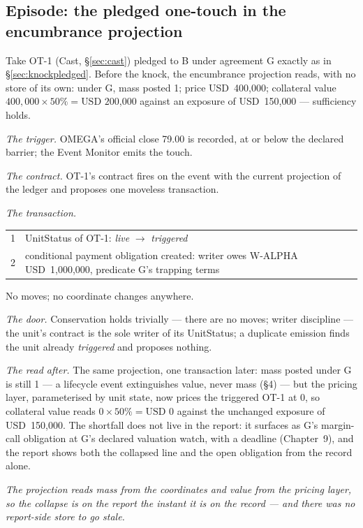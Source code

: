 \documentclass[11pt,a4paper]{article}
\newcommand{\USD}[1]{\mbox{USD~#1}}
\begin{document}
\subsection{Episode: the pledged one-touch in the encumbrance projection}

Take OT-1 (Cast, \S\ref{sec:cast}) pledged to B under agreement G exactly as in
\S\ref{sec:knockpledged}. Before the knock, the encumbrance projection reads, with no
store of its own: under G, mass posted 1; price \USD{400{,}000}; collateral value
$400{,}000 \times 50\% = \USD{200{,}000}$ against an exposure of
\USD{150{,}000} --- sufficiency holds.

\emph{The trigger.} OMEGA's official close 79.00 is recorded, at or below the
declared barrier; the Event Monitor emits the touch.

\emph{The contract.} OT-1's contract fires on the event with the current
projection of the ledger and proposes one moveless transaction.

\emph{The transaction.}
\begin{center}
\begin{tabular}{@{}rl@{}}
\toprule
1 & UnitStatus of OT-1: \emph{live} $\to$ \emph{triggered} \\
2 & conditional payment obligation created: writer owes W-ALPHA
    \USD{1{,}000{,}000}, predicate G's trapping terms \\
\bottomrule
\end{tabular}
\end{center}
No moves; no coordinate changes anywhere.

\emph{The door.} Conservation holds trivially --- there are no moves; writer
discipline --- the unit's contract is the sole writer of its UnitStatus; a
duplicate emission finds the unit already \emph{triggered} and proposes
nothing.

\emph{The read after.} The same projection, one transaction later: mass posted
under G is still 1 --- a lifecycle event extinguishes value, never mass
(\S 4) --- but the pricing layer, parameterised by unit state, now prices the
triggered OT-1 at 0, so collateral value reads $0 \times 50\% = \USD{0}$
against the unchanged exposure of \USD{150{,}000}. The shortfall does not live
in the report: it surfaces as G's margin-call obligation at G's declared
valuation watch, with a deadline (Chapter~9), and the report shows both the
collapsed line and the open obligation from the record alone.

\emph{The projection reads mass from the coordinates and value from the pricing
layer, so the collapse is on the report the instant it is on the record --- and
there was no report-side store to go stale.}
\end{document}
